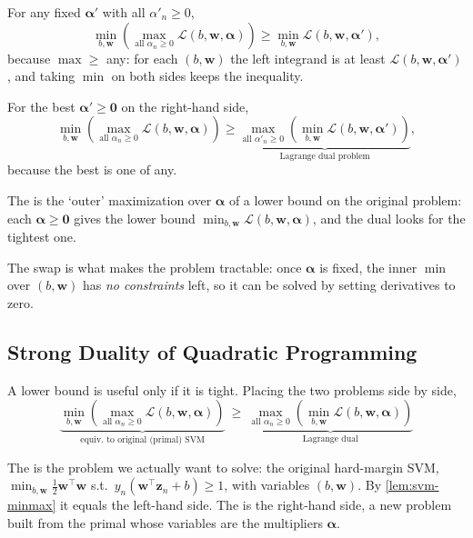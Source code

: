 For any fixed \(\bm{\alpha}'\) with all \(\alpha'_n \ge 0\),
\[
    \min_{b, \bm{w}} \left( \max_{\text{all } \alpha_n \ge 0}
    \mathcal{L}(b, \bm{w}, \bm{\alpha}) \right) \ge \min_{b, \bm{w}}
    \mathcal{L}(b, \bm{w}, \bm{\alpha}'),
\]
because \(\max \ge\) any: for each \((b, \bm{w})\) the left integrand is at
least \(\mathcal{L}(b, \bm{w}, \bm{\alpha}')\), and taking \(\min\) on both
sides keeps the inequality.

For the best \(\bm{\alpha}' \ge \bm{0}\) on the right-hand side,
\[
    \min_{b, \bm{w}} \left( \max_{\text{all } \alpha_n \ge 0}
    \mathcal{L}(b, \bm{w}, \bm{\alpha}) \right) \ge
    \underbrace{\max_{\text{all } \alpha'_n \ge 0} \left( \min_{b, \bm{w}}
    \mathcal{L}(b, \bm{w}, \bm{\alpha}') \right)}_{\text{Lagrange dual
    problem}},
\]
because the best is one of any.

\begin{definition}
    The  is the `outer' maximization over
    \(\bm{\alpha}\) of a lower bound on the original problem: each
    \(\bm{\alpha} \ge \bm{0}\) gives the lower bound \(\min_{b, \bm{w}}
    \mathcal{L}(b, \bm{w}, \bm{\alpha})\), and the dual looks for the
    tightest one.
\end{definition}

The swap is what makes the problem tractable: once \(\bm{\alpha}\) is
fixed, the inner \(\min\) over \((b, \bm{w})\) has \emph{no constraints}
left, so it can be solved by setting derivatives to zero.

\subsection{Strong Duality of Quadratic Programming}

A lower bound is useful only if it is tight. Placing the two problems side
by side,
\[
    \underbrace{\min_{b, \bm{w}} \left( \max_{\text{all } \alpha_n \ge 0}
    \mathcal{L}(b, \bm{w}, \bm{\alpha}) \right)}_{\text{equiv.\ to original
    (primal) SVM}}
    \ \ge \
    \underbrace{\max_{\text{all } \alpha_n \ge 0} \left( \min_{b, \bm{w}}
    \mathcal{L}(b, \bm{w}, \bm{\alpha}) \right)}_{\text{Lagrange dual}}
\]

\begin{definition}
    The  is the problem we actually want to solve: the
    original hard-margin SVM, \(\min_{b, \bm{w}} \frac{1}{2} \bm{w}^\top
    \bm{w}\) s.t.\ \(y_n (\bm{w}^\top \bm{z}_n + b) \ge 1\), with variables
    \((b, \bm{w})\). By \autoref{lem:svm-minmax} it equals the left-hand
    side. The \vocab{dual problem} is the right-hand side, a new problem built
    from the primal whose variables are the multipliers \(\bm{\alpha}\).
\end{definition}

